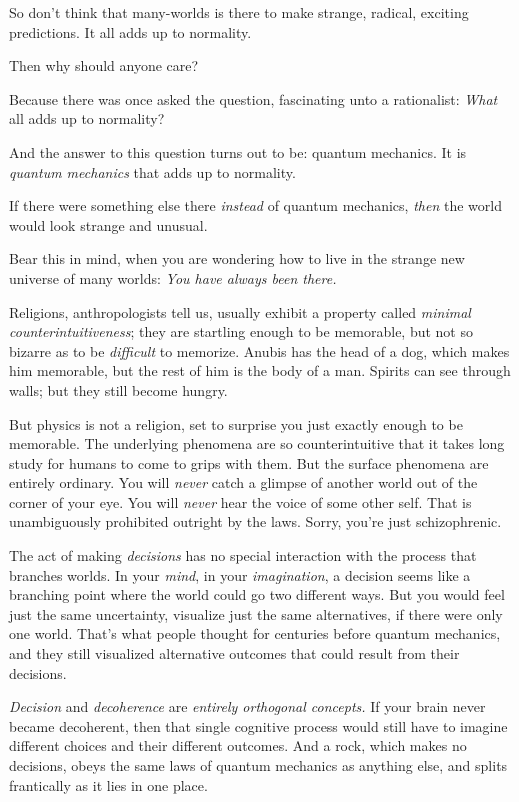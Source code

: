 {
 So don't think that many-worlds is there to make
strange, radical, exciting predictions. It all adds up to normality.}

{
 Then why should anyone care?}

{
 Because there was once asked the question, fascinating unto a
rationalist: \textit{What} all adds up to normality?}

{
 And the answer to this question turns out to be: quantum
mechanics. It is \textit{quantum mechanics} that adds up to normality.}

{
 If there were something else there \textit{instead} of quantum
mechanics, \textit{then} the world would look strange and unusual.}

{
 Bear this in mind, when you are wondering how to live in the
strange new universe of many worlds: \textit{You have always been
there.}}

{
 Religions, anthropologists tell us, usually exhibit a property
called \textit{minimal counterintuitiveness}; they are startling enough
to be memorable, but not so bizarre as to be \textit{difficult} to
memorize. Anubis has the head of a dog, which makes him memorable, but
the rest of him is the body of a man. Spirits can see through walls;
but they still become hungry.}

{
 But physics is not a religion, set to surprise you just exactly
enough to be memorable. The underlying phenomena are so
counterintuitive that it takes long study for humans to come to grips
with them. But the surface phenomena are entirely ordinary. You will
\textit{never} catch a glimpse of another world out of the corner of
your eye. You will \textit{never} hear the voice of some other self.
That is unambiguously prohibited outright by the laws. Sorry,
you're just schizophrenic.}

{
 The act of making \textit{decisions} has no special interaction
with the process that branches worlds. In your \textit{mind}, in your
\textit{imagination}, a decision seems like a branching point where the
world could go two different ways. But you would feel just the same
uncertainty, visualize just the same alternatives, if there were only
one world. That's what people thought for centuries
before quantum mechanics, and they still visualized alternative
outcomes that could result from their decisions.}

{
 \textit{Decision} and \textit{decoherence} are \textit{entirely
orthogonal concepts.} If your brain never became decoherent, then that
single cognitive process would still have to imagine different choices
and their different outcomes. And a rock, which makes no decisions,
obeys the same laws of quantum mechanics as anything else, and splits
frantically as it lies in one place.}

